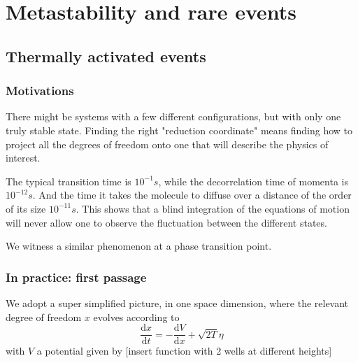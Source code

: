 \documentclass[a4paper]{book}
\theoremstyle{definition}
\theoremstyle{remark}
\begin{document}
\chapter{Metastability and rare events}
\section{Thermally activated events}
\subsection{Motivations}

There might be systems with a few different configurations, but with only one truly stable state. Finding the right "reduction coordinate" means finding how to project all the degrees of freedom onto one that will describe the physics of interest. \par\medskip 

The typical transition time is $10^{-1}s$, while the decorrelation time of momenta is $10^{-12}s$. And the time it takes the molecule to diffuse over a distance of the order of its size $10^{-11}s$. This shows that a blind integration of the equations of motion will never allow one to observe the fluctuation between the different states.\par \medskip 

We witness a similar phenomenon at a phase transition point. 

\subsection{In practice: first passage}
We adopt a super simplified picture, in one space dimension, where the relevant degree of freedom $x$ evolves according to 
\begin{equation}
    \frac{\text{d}x}{\text{d}t} = -\frac{\text{d}V}{\text{d}x} + \sqrt{2T}\eta
\end{equation}
with $V$ a potential given by [insert function with 2 wells at different heights] \par \medskip 
\end{document}
